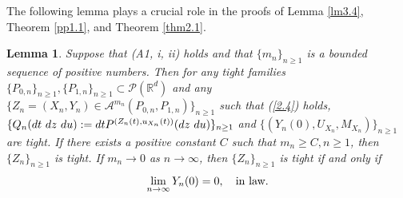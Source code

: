 \documentclass[12pt]{article}
\newtheorem{lemma}{Lemma}[section]
\begin{document}
The following lemma plays a crucial role in the proofs of Lemma \ref{lm3.4}, Theorem \ref{pp1.1}, and Theorem \ref{thm2.1}.

\begin{lemma}\label{lm3.3}
Suppose that (A1, i, ii) holds and that $\{m_n\}_{n\ge 1}$ is a bounded sequence of positive numbers.
Then for any tight families $\{P_{0,n}\}_{n\ge 1}, \{P_{1,n}\}_{n\ge 1}\subset\mathcal{P}(\mathbb{R}^d)$ and any $\{Z_n=(X_n, Y_n)\in\mathcal{A}^{m_n}(P_{0,n},P_{1,n})\}_{n\ge 1}$ such that (\ref{2.4}) holds,
$\{Q_n (dt\hbox{ }dz\hbox{ }du):=dtP^{(Z_n(t),u_{X_n}(t))}(dz\hbox{ }du)\}_{n\ge 1}$ 
and $\{(Y_n(0), U_{X_n},M_{X_n})\}_{n\ge 1}$ are tight.
If there exists a positive constant $C$ such that $m_n\ge C, n\ge 1$, 
then $\{Z_n\}_{n\ge 1}$ is tight.
If $m_n\to 0$ as $n\to\infty$, then
$\{Z_n\}_{n\ge 1}$ is tight if and only if 
$$\lim_{n\to\infty}Y_n(0)=0,\quad \hbox{in law}.$$


\end{lemma}
\end{document}
